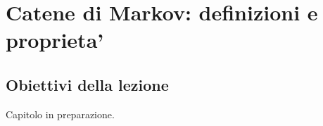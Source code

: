 
\chapter{Catene di Markov: definizioni e proprieta'}

\section{Obiettivi della lezione}

Capitolo in preparazione.

